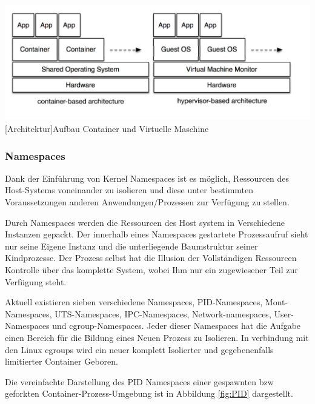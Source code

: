 \vspace{1em}
\begin{minipage}{\linewidth}
	\centering
	\includegraphics[width=1\linewidth]{pics/docker2.png}
	[Architektur]{Aufbau Container und Virtuelle Maschine \cite{Xavier2015AClouds}}
	\label{fig:architecture}
\end{minipage}

\subsubsection{Namespaces}
Dank der Einführung von Kernel Namespaces ist es möglich, Ressourcen des Host-Systems voneinander zu isolieren und diese unter bestimmten Voraussetzungen anderen Anwendungen/Prozessen zur Verfügung zu stellen. 

Durch Namespaces werden die Ressourcen des Host system in Verschiedene Instanzen gepackt. Der innerhalb eines Namespaces gestartete Prozessaufruf sieht nur seine Eigene Instanz und die unterliegende Baumstruktur seiner Kindprozesse. Der Prozess selbst hat die Illusion der Vollständigen Ressourcen Kontrolle über das komplette System, wobei Ihm nur ein zugewiesener Teil zur Verfügung steht.

Aktuell existieren sieben verschiedene Namespaces, PID-Namespaces, Mont-Namespaces, UTS-Namespaces, IPC-Namespaces, Network-namespaces, User-Namespaces und cgroup-Namespaces. Jeder dieser Namespaces hat die Aufgabe einen Bereich für die Bildung eines Neuen Prozess zu Isolieren. In verbindung mit den Linux cgroups wird ein neuer komplett Isolierter und gegebenenfalls limitierter Container Geboren.

Die vereinfachte Darstellung des PID Namespaces einer gespawnten bzw geforkten Container-Prozess-Umgebung ist in Abbildung \ref{fig:PID} dargestellt. \cite{Liebel2017SkalierbareContainer-Infrastrukturen}

